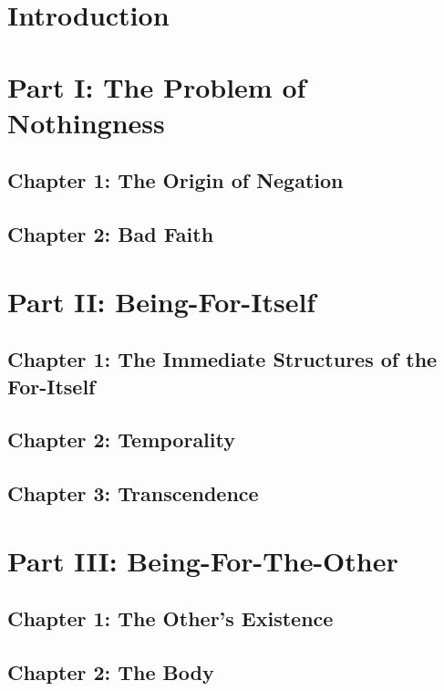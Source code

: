 \section{Introduction}

\section{Part I: The Problem of Nothingness}

\subsection{Chapter 1: The Origin of Negation}

\subsection{Chapter 2: Bad Faith}

\section{Part II: Being-For-Itself}

\subsection{Chapter 1: The Immediate Structures of the For-Itself}

\subsection{Chapter 2: Temporality}

\subsection{Chapter 3: Transcendence}

\section{Part III: Being-For-The-Other}

\subsection{Chapter 1: The Other's Existence}

\subsection{Chapter 2: The Body}

